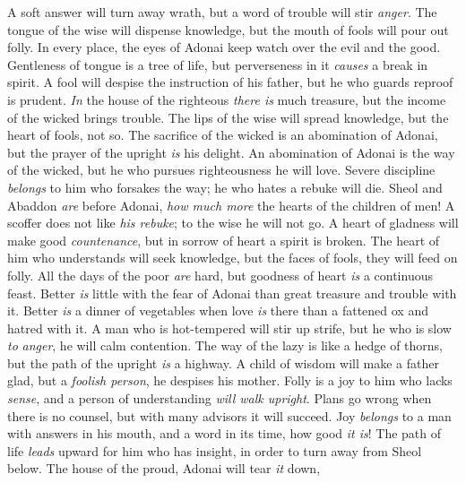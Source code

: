 \begin{biblechapter} %
\verse A soft answer will turn away wrath, 
but a word of trouble will stir \textit{anger}.
\verse The tongue of the wise will dispense knowledge, 
but the mouth of fools will pour out folly.
\verse In every place, the eyes of Adonai 
keep watch over the evil and the good.
\verse Gentleness of tongue is a tree of life, 
but perverseness in it \textit{causes} a break in spirit.
\verse A fool will despise the instruction of his father, 
but he who guards reproof is prudent.
\verse \textit{In} the house of the righteous \textit{there is} much treasure, 
but the income of the wicked brings trouble.
\verse The lips of the wise will spread knowledge, 
but the heart of fools, not so.
\verse The sacrifice of the wicked is an abomination of Adonai, 
but the prayer of the upright \textit{is} his delight.
\verse An abomination of Adonai is the way of the wicked, 
but he who pursues righteousness he will love.
\verse Severe discipline \textit{belongs} to him who forsakes the way; 
he who hates a rebuke will die.
\verse Sheol and Abaddon \textit{are} before Adonai, 
\textit{how much more} the hearts of the children of men!
\verse A scoffer does not like \textit{his rebuke}; 
to the wise he will not go.
\verse A heart of gladness will make good \textit{countenance}, 
but in sorrow of heart a spirit is broken.
\verse The heart of him who understands will seek knowledge, 
but the faces of fools, they will feed on folly.
\verse All the days of the poor \textit{are} hard, 
but goodness of heart \textit{is} a continuous feast.
\verse Better \textit{is} little with the fear of Adonai 
than great treasure and trouble with it.
\verse Better \textit{is} a dinner of vegetables when love \textit{is} there 
than a fattened ox and hatred with it.
\verse A man who is hot-tempered will stir up strife, 
but he who is slow \textit{to} \textit{anger}, he will calm contention.
\verse The way of the lazy is like a hedge of thorns, 
but the path of the upright \textit{is} a highway.
\verse A child of wisdom will make a father glad, 
but a \textit{foolish person}, he despises his mother.
\verse Folly is a joy to him who lacks \textit{sense}, 
and a person of understanding \textit{will walk upright}.
\verse Plans go wrong when there is no counsel, 
but with many advisors it will succeed.
\verse Joy \textit{belongs} to a man with answers in his mouth, 
and a word in its time, how good \textit{it is}!
\verse The path of life \textit{leads} upward for him who has insight, 
in order to turn away from Sheol below.
\verse The house of the proud, Adonai will tear \textit{it} down, 

\end{biblechapter}
